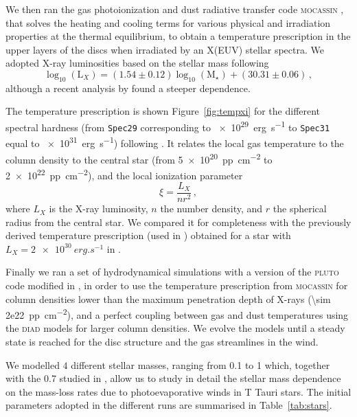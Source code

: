 \documentclass[usenatbib,useAMS,usedcolumn]{mnras}
\begin{document}
We then ran the gas photoionization and dust radiative transfer code \textsc{mocassin} , that solves the heating and cooling terms for various physical and irradiation properties at the thermal equilibrium, to obtain a temperature prescription in the upper layers of the discs when irradiated by an X(EUV) stellar spectra.
We adopted X-ray luminosities based on the stellar mass following 
\begin{equation}\label{eq:Lx}
	\log_{10}{(\mathrm{L}_X)} = (1.54 \pm 0.12) \log_{10}{(\mathrm{M}_\star)} + (30.31 \pm 0.06)\,,
\end{equation}
although a recent analysis by  found a steeper dependence.

The temperature prescription is shown Figure~\ref{fig:tempxi} for the different spectral hardness (from \texttt{Spec29} corresponding to \SI{e29}{erg.s^{-1}} to \texttt{Spec31} equal to \SI{e31}{erg.s^{-1}}) following .
It relates the local gas temperature to the column density to the central star (from \SI{5e20}{pp.cm^{-2}} to \SI{2e22}{pp.cm^{-2}}), and the local ionization parameter 
\begin{equation}
    \xi = \frac{L_X}{n r^2}\,,
\end{equation}
where $L_X$ is the X-ray luminosity, $n$ the number density, and $r$ the spherical radius from the central star. We compared it for completeness with the previously derived temperature prescription (used in ) obtained for a star with $L_X=\SI{2e30}{erg.s^{-1}}$ in .

Finally we ran a set of hydrodynamical simulations with a version of the \textsc{pluto} code  modified in , in order to use the temperature prescription from \textsc{mocassin} for column densities lower than the maximum penetration depth of X-rays (\SI{\sim 2e22}{pp.cm^{-2}}), and a perfect coupling between gas and dust temperatures using the \textsc{diad} models for larger column densities.
We evolve the models until a steady state is reached for the disc structure and the gas streamlines in the wind.

We modelled $4$ different stellar masses, ranging from \SI{0.1}{\solarmass} to \SI{1}{\solarmass} which, together with the \SI{0.7}{\solarmass} studied in , allow us to study in detail the stellar mass dependence on the mass-loss rates due to photoevaporative winds in T Tauri stars. The initial parameters adopted in the different runs are summarised in Table~\ref{tab:stars}.
\end{document}

